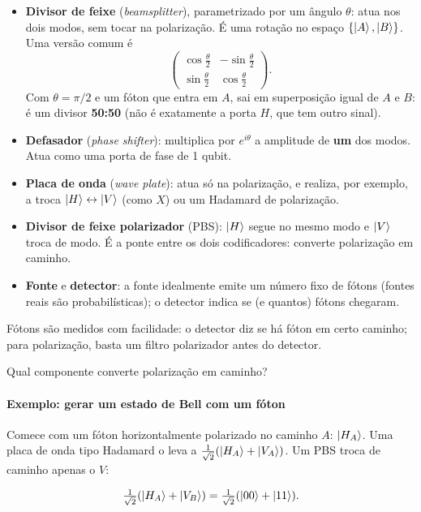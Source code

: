 \begin{itemize}
\tightlist
\item
  \textbf{Divisor de feixe} (\emph{beamsplitter}), parametrizado por um ângulo \(\theta\): atua nos dois modos, sem tocar na polarização. É uma rotação no espaço \(\{\left|{A}\right>,\left|{B}\right>\}\). Uma versão comum é
  \[
  \begin{pmatrix}\cos\frac\theta2 & -\sin\frac\theta2\\ \sin\frac\theta2 & \cos\frac\theta2\end{pmatrix}.
  \]
  Com \(\theta=\pi/2\) e um fóton que entra em \(A\), sai em superposição igual de \(A\) e \(B\): é um divisor \textbf{50:50} (não é exatamente a porta \(H\), que tem outro sinal).
\item
  \textbf{Defasador} (\emph{phase shifter}): multiplica por \(e^{i\theta}\) a amplitude de \textbf{um} dos modos. Atua como uma porta de fase de 1 qubit.
\item
  \textbf{Placa de onda} (\emph{wave plate}): atua só na polarização, e realiza, por exemplo, a troca \(\left|{H}\right>\leftrightarrow\left|{V}\right>\) (como \(X\)) ou um Hadamard de polarização.
\item
  \textbf{Divisor de feixe polarizador} (PBS): \(\left|{H}\right>\) segue no mesmo modo e \(\left|{V}\right>\) troca de modo. É a ponte entre os dois codificadores: converte polarização em caminho.
\item
  \textbf{Fonte} e \textbf{detector}: a fonte idealmente emite um número fixo de fótons (fontes reais são probabilísticas); o detector indica se (e quantos) fótons chegaram.
\end{itemize}

Fótons são medidos com facilidade: o detector diz se há fóton em certo caminho; para polarização, basta um filtro polarizador antes do detector.

Qual componente converte polarização em caminho?

\paragraph{Exemplo: gerar um estado de Bell com um fóton}\label{exemplo-gerar-um-estado-de-bell-com-um-fuxf3ton}

Comece com um fóton horizontalmente polarizado no caminho \(A\): \(\left|{H_A}\right>\). Uma placa de onda tipo Hadamard o leva a \(\tfrac{1}{\sqrt2}(\left|{H_A}\right>+\left|{V_A}\right>)\). Um PBS troca de caminho apenas o \(V\):

\[
\tfrac{1}{\sqrt2}(\left|{H_A}\right>+\left|{V_B}\right>) = \tfrac{1}{\sqrt2}(\left|{00}\right>+\left|{11}\right>).
\]

